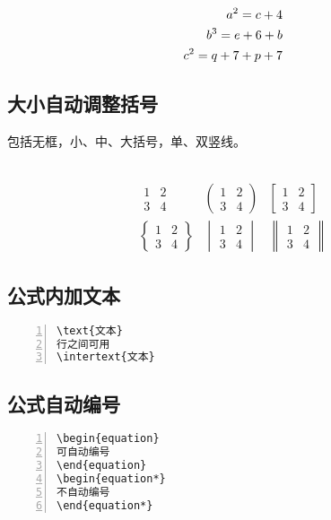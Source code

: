 \begin{align}
  a^2 =c+4 \notag\\
  b^3 =e+6+b\\
  c^2=q+7+p+7
\end{align}

\subsection{大小自动调整括号}

包括无框，小、中、大括号，单、双竖线。\\
~\\
\par
\[\begin{matrix}
\begin{matrix} 1 & 2\\ 3 & 4 \end{matrix} &
\begin{pmatrix} 1 & 2\\ 3 & 4 \end{pmatrix} &
\begin{bmatrix} 1 & 2\\ 3 & 4 \end{bmatrix}\\[12pt]
\begin{Bmatrix} 1 & 2\\ 3 & 4 \end{Bmatrix} &
\begin{vmatrix} 1 & 2\\ 3 & 4 \end{vmatrix} &
\begin{Vmatrix} 1 & 2\\ 3 & 4 \end{Vmatrix}
\end{matrix}\]

\subsection{公式内加文本}
\begin{Verbatim}[formatcom=\color{grass},frame=single,numbers=left]
\text{文本}
行之间可用
\intertext{文本}
\end{Verbatim}

\subsection{公式自动编号}
\begin{Verbatim}[formatcom=\color{grass},frame=single,numbers=left]
\begin{equation}
可自动编号
\end{equation}
\begin{equation*}
不自动编号
\end{equation*}
\end{Verbatim}
